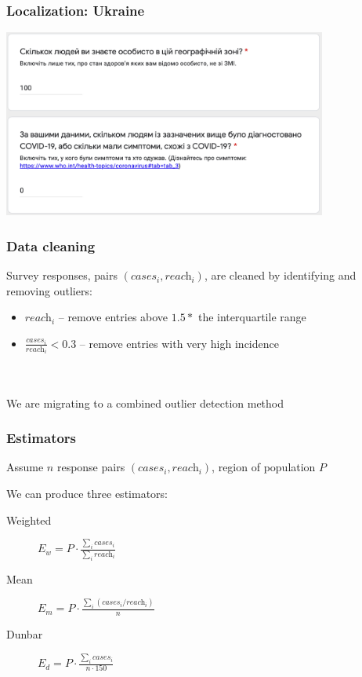 \documentclass{beamer}
\begin{document}
\begin{frame}
  \frametitle{Localization: Ukraine}
  \begin{center}
  \includegraphics[width=0.8\textwidth]{Ukrain.png}
  \end{center}
\end{frame}

\begin{frame}
  \frametitle{Data cleaning}
  Survey responses, pairs  $(\textit{cases}_i,\textit{reach}_i)$, are cleaned by identifying and removing outliers: 
  \begin{itemize}
    \item $\textit{reach}_i$ \--- remove entries above $1.5 *$  the  interquartile  range
    \item $\frac{\textit{cases}_i}{\textit{reach}_i} < 0.3$ \--- remove entries with very high incidence
  \end{itemize}
  ~\\~\\
  We are migrating to a combined outlier detection method

\end{frame}

\begin{frame}
  \frametitle{Estimators}
  Assume $n$ response pairs $(\textit{cases}_i,\textit{reach}_i)$, region of population $P$  

  We can produce three estimators: 
  \begin{description}
    \item[Weighted] $E_w  =  P \cdot \frac{\sum_{i} \textit{cases}_i}{\sum_{i} \textit{reach}_i}$
    \item[Mean] $E_m  =  P \cdot \frac{\sum_i (\textit{cases}_i / \textit{reach}_i)}{n}$
    \item[Dunbar] $E_d  =  P \cdot \frac{\sum_{i} \textit{cases}_i}{n \cdot 150}$
  \end{description}
\end{frame}
\end{document}
